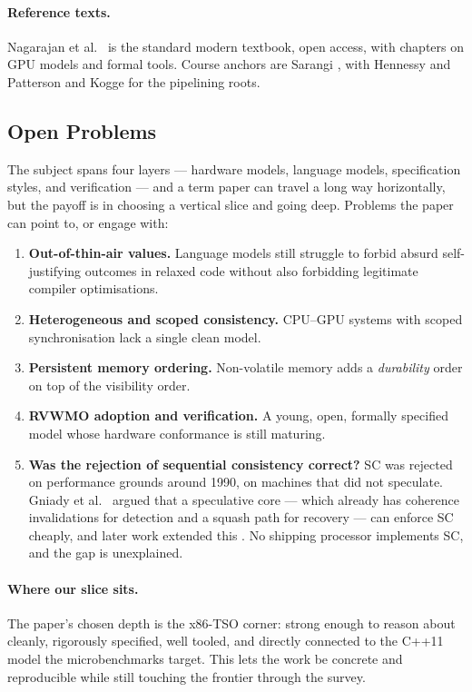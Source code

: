 \paragraph{Reference texts.}
Nagarajan et al.\ \cite{nagarajan2020primer} is the standard modern textbook,
open access, with chapters on GPU models and formal tools.
Course anchors are Sarangi \cite{sarangi2025basic,sarangi2023nextgen}, with
Hennessy and Patterson \cite{hennessy2019quantitative} and Kogge
\cite{kogge1981pipelined} for the pipelining roots.

\subsection{Open Problems}

The subject spans four layers --- hardware models, language models,
specification styles, and verification --- and a term paper can travel a long
way horizontally, but the payoff is in choosing a vertical slice and going deep.
Problems the paper can point to, or engage with:

\begin{enumerate}[leftmargin=*,itemsep=2pt]
\item \textbf{Out-of-thin-air values.} Language models still struggle to forbid
  absurd self-justifying outcomes in relaxed code without also forbidding
  legitimate compiler optimisations.
\item \textbf{Heterogeneous and scoped consistency.} CPU--GPU systems with
  scoped synchronisation lack a single clean model.
\item \textbf{Persistent memory ordering.} Non-volatile memory adds a
  \emph{durability} order on top of the visibility order.
\item \textbf{RVWMO adoption and verification.} A young, open, formally specified
  model whose hardware conformance is still maturing.
\item \textbf{Was the rejection of sequential consistency correct?} SC was
  rejected on performance grounds around 1990, on machines that did not
  speculate. Gniady et al.\ \cite{gniady1999sc} argued that a speculative core
  --- which already has coherence invalidations for detection and a squash path
  for recovery --- can enforce SC cheaply, and later work extended this
  \cite{ceze2007bulksc,blundell2009invisifence,marino2011sc}. No shipping
  processor implements SC, and the gap is unexplained.
\end{enumerate}

\paragraph{Where our slice sits.}
The paper's chosen depth is the x86-TSO corner: strong enough to reason about
cleanly, rigorously specified, well tooled, and directly connected to the C++11
model the microbenchmarks target.
This lets the work be concrete and reproducible while still touching the
frontier through the survey.
